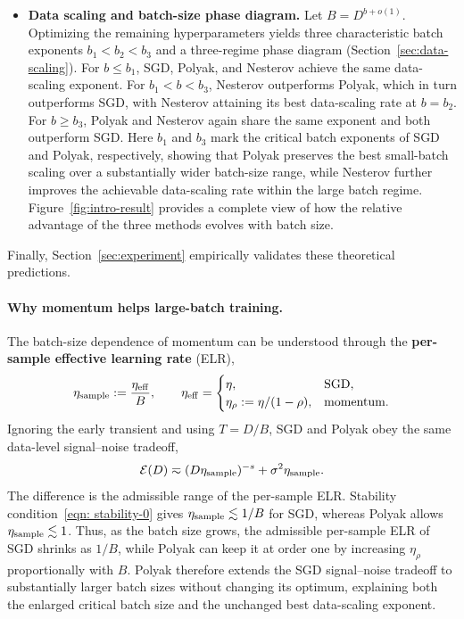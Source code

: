 \documentclass[11pt]{article}
\begin{document}
\begin{itemize}
\item \textbf{Data scaling and batch-size phase diagram.}
Let \(B=D^{b+o(1)}\). Optimizing the remaining hyperparameters yields three characteristic batch exponents \(b_1<b_2<b_3\) and a three-regime phase diagram (Section~\ref{sec:data-scaling}). For \(b\leq b_1\), SGD, Polyak, and Nesterov achieve the same data-scaling exponent. For \(b_1<b<b_3\), Nesterov outperforms Polyak, which in turn outperforms SGD, with Nesterov attaining its best data-scaling rate at \(b=b_2\). For \(b\geq b_3\), Polyak and Nesterov again share the same exponent and both outperform SGD. Here \(b_1\) and \(b_3\) mark the critical batch exponents of SGD and Polyak, respectively, showing that Polyak preserves the best small-batch scaling over a substantially wider batch-size range, while Nesterov further improves the achievable data-scaling rate within the large batch regime. Figure~\ref{fig:intro-result} provides a complete view of how the relative advantage of the three methods evolves with batch size.
\end{itemize}
Finally, Section~\ref{sec:experiment} empirically validates these theoretical predictions.

\paragraph{Why momentum helps large-batch training.}
The batch-size dependence of momentum can be understood through the \textbf{per-sample effective learning rate} (ELR),
\[
\eta_{\rm sample}:=\frac{\eta_{\rm eff}}{B},\qquad
\eta_{\rm eff}=
\begin{cases}
\eta, & \textnormal{SGD},\\
\eta_\rho:=\eta/(1-\rho), & \textnormal{momentum}.
\end{cases}
\]
Ignoring the early transient and using \(T=D/B\), SGD and Polyak obey the same data-level signal--noise tradeoff,
\[
\mathcal E(D)\eqsim(D\eta_{\rm sample})^{-s}+\sigma^2\eta_{\rm sample}.
\]
The difference is the admissible range of the per-sample ELR. Stability condition~\eqref{eqn: stability-0} gives \(\eta_{\rm sample}\lesssim1/B\) for SGD, whereas Polyak allows \(\eta_{\rm sample}\lesssim1\). Thus, as the batch size grows, the admissible per-sample ELR of SGD shrinks as \(1/B\), while Polyak can keep it at order one by increasing \(\eta_\rho\) proportionally with \(B\). Polyak therefore extends the SGD signal--noise tradeoff to substantially larger batch sizes without changing its optimum, explaining both the enlarged critical batch size and the unchanged best data-scaling exponent.
\end{document}
